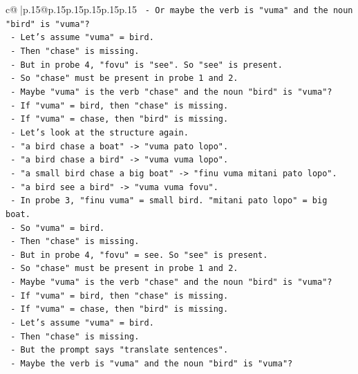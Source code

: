 \documentclass{article}
\begin{document}
{\begin{supertabular}{c@{$\;$}|p{.15\linewidth}@{}p{.15\linewidth}p{.15\linewidth}p{.15\linewidth}p{.15\linewidth}p{.15\linewidth}}
{{{\texttt{    {-} Or maybe the verb is "vuma" and the noun "bird" is "vuma"?} \\
\texttt{    {-} Let's assume "vuma" = bird.} \\
\texttt{    {-} Then "chase" is missing.} \\
\texttt{    {-} But in probe 4, "fovu" is "see". So "see" is present.} \\
\texttt{    {-} So "chase" must be present in probe 1 and 2.} \\
\texttt{    {-} Maybe "vuma" is the verb "chase" and the noun "bird" is "vuma"?} \\
\texttt{    {-} If "vuma" = bird, then "chase" is missing.} \\
\texttt{    {-} If "vuma" = chase, then "bird" is missing.} \\
\texttt{    {-} Let's look at the structure again.} \\
\texttt{    {-} "a bird chase a boat" {-}> "vuma pato lopo".} \\
\texttt{    {-} "a bird chase a bird" {-}> "vuma vuma lopo".} \\
\texttt{    {-} "a small bird chase a big boat" {-}> "finu vuma mitani pato lopo".} \\
\texttt{    {-} "a bird see a bird" {-}> "vuma vuma fovu".} \\
\texttt{    {-} In probe 3, "finu vuma" = small bird. "mitani pato lopo" = big boat.} \\
\texttt{    {-} So "vuma" = bird.} \\
\texttt{    {-} Then "chase" is missing.} \\
\texttt{    {-} But in probe 4, "fovu" = see. So "see" is present.} \\
\texttt{    {-} So "chase" must be present in probe 1 and 2.} \\
\texttt{    {-} Maybe "vuma" is the verb "chase" and the noun "bird" is "vuma"?} \\
\texttt{    {-} If "vuma" = bird, then "chase" is missing.} \\
\texttt{    {-} If "vuma" = chase, then "bird" is missing.} \\
\texttt{    {-} Let's assume "vuma" = bird.} \\
\texttt{    {-} Then "chase" is missing.} \\
\texttt{    {-} But the prompt says "translate sentences".} \\
\texttt{    {-} Maybe the verb is "vuma" and the noun "bird" is "vuma"?} \\
}}}
\end{supertabular}}
\end{document}
